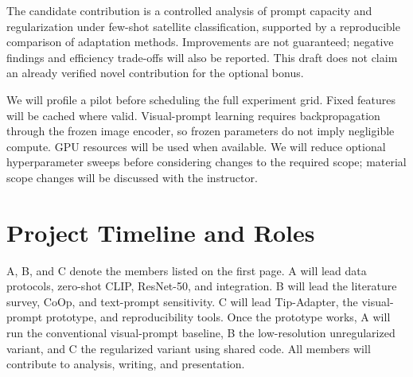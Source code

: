 \documentclass[11pt,letterpaper]{article}
\begin{document}
The candidate contribution is a controlled analysis of prompt capacity and regularization under few-shot satellite classification, supported by a reproducible comparison of adaptation methods. Improvements are not guaranteed; negative findings and efficiency trade-offs will also be reported. This draft does not claim an already verified novel contribution for the optional bonus.

We will profile a pilot before scheduling the full experiment grid. Fixed features will be cached where valid. Visual-prompt learning requires backpropagation through the frozen image encoder, so frozen parameters do not imply negligible compute. GPU resources will be used when available. We will reduce optional hyperparameter sweeps before considering changes to the required scope; material scope changes will be discussed with the instructor.

\section{Project Timeline and Roles}

A, B, and C denote the members listed on the first page. A will lead data protocols, zero-shot CLIP, ResNet-50, and integration. B will lead the literature survey, CoOp, and text-prompt sensitivity. C will lead Tip-Adapter, the visual-prompt prototype, and reproducibility tools. Once the prototype works, A will run the conventional visual-prompt baseline, B the low-resolution unregularized variant, and C the regularized variant using shared code. All members will contribute to analysis, writing, and presentation.
\end{document}
